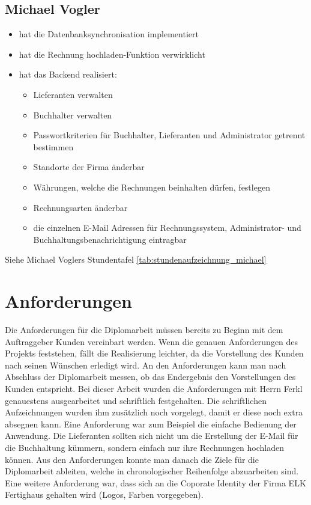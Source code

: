 \subsection{Michael Vogler}
\begin{itemize}
\item hat die Datenbanksynchronisation implementiert
\item hat die \glqq Rechnung hochladen\grqq -Funktion verwirklicht
\item hat das Backend realisiert:
\begin{itemize}
\item Lieferanten verwalten
\item Buchhalter verwalten
\item Passwortkriterien für Buchhalter, Lieferanten und Administrator getrennt bestimmen
\item Standorte der Firma änderbar
\item Währungen, welche die Rechnungen beinhalten dürfen, festlegen
\item Rechnungsarten änderbar
\item die einzelnen E-Mail Adressen für Rechnungssystem, Administrator- und Buchhaltungsbenachrichtigung eintragbar
\end{itemize}
\end{itemize}
Siehe Michael Voglers Stundentafel \ref{tab:stundenaufzeichnung_michael}



\section{Anforderungen}
Die Anforderungen für die Diplomarbeit müssen bereits zu Beginn mit dem Auftraggeber Kunden vereinbart werden. Wenn die genauen Anforderungen des Projekts feststehen, fällt die Realisierung leichter, da die Vorstellung des Kunden nach seinen Wünschen erledigt wird. An den Anforderungen kann man nach Abschluss der Diplomarbeit messen, ob das Endergebnis den Vorstellungen des Kunden entspricht.
Bei dieser Arbeit wurden die Anforderungen mit Herrn Ferkl genauestens ausgearbeitet und schriftlich festgehalten. Die schriftlichen Aufzeichnungen wurden ihm zusätzlich noch vorgelegt, damit er diese noch extra absegnen kann.
Eine Anforderung war zum Beispiel die einfache Bedienung der Anwendung. Die Lieferanten sollten sich nicht um die Erstellung der E-Mail für die Buchhaltung kümmern, sondern einfach nur ihre Rechnungen hochladen können. Aus den Anforderungen konnte man danach die Ziele für die Diplomarbeit ableiten, welche in chronologischer Reihenfolge abzuarbeiten sind. Eine weitere Anforderung war, dass sich an die Coporate Identity der Firma ELK Fertighaus gehalten wird (Logos, Farben vorgegeben).

